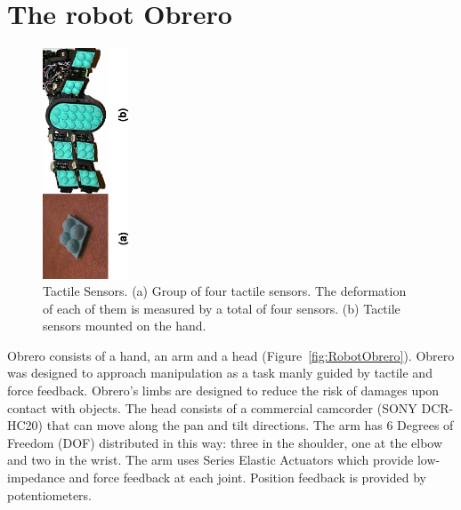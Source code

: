 \section{The robot Obrero}
\label{sec:platform}


\begin{figure}[tbp]
\centerline{
\includegraphics[width=1.0in, angle=270 ]{./figures/Tactiles.eps}
} \caption{Tactile Sensors. (a) Group of four tactile sensors. The
deformation of each of them is measured by a total of four sensors.
(b) Tactile sensors mounted on the hand.} \label{fig:TactileSensors}
\end{figure}

Obrero \cite{obrero} consists of a hand, an arm and a head
(Figure~\ref{fig:RobotObrero}). Obrero was designed to approach
manipulation as a task manly guided by tactile and force feedback.
Obrero's limbs are designed to
reduce the risk of damages upon contact with objects.
The head consists of a
commercial camcorder (SONY DCR-HC20) that can move along the pan
and tilt directions. The arm has 6 Degrees of Freedom (DOF)
distributed in this way: three in the shoulder, one at the elbow
and two in the wrist. The arm \cite{AaronArm} uses Series Elastic
Actuators \cite{williamson95series} which provide low-impedance
and force feedback at each joint. Position feedback is provided by
potentiometers.


